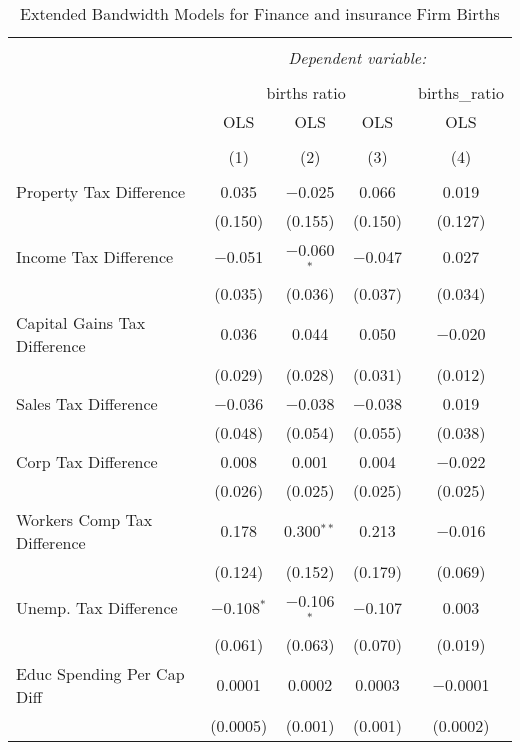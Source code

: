 
\begin{table}[!htbp] \centering 
  \caption{Extended Bandwidth Models for  Finance and insurance Firm Births} 
  \label{52eb} 
\begin{tabular}{@{\extracolsep{5pt}}lcccc} 
\\[-1.8ex]\hline 
\hline \\[-1.8ex] 
 & \multicolumn{4}{c}{\textit{Dependent variable:}} \\ 
\cline{2-5} 
\\[-1.8ex] & \multicolumn{3}{c}{births ratio} & births\_ratio \\ 
 & OLS & OLS & OLS & OLS \\ 
\\[-1.8ex] & (1) & (2) & (3) & (4)\\ 
\hline \\[-1.8ex] 
 Property Tax Difference & 0.035 & $-$0.025 & 0.066 & 0.019 \\ 
  & (0.150) & (0.155) & (0.150) & (0.127) \\ 
  Income Tax Difference & $-$0.051 & $-$0.060$^{*}$ & $-$0.047 & 0.027 \\ 
  & (0.035) & (0.036) & (0.037) & (0.034) \\ 
  Capital Gains Tax Difference & 0.036 & 0.044 & 0.050 & $-$0.020 \\ 
  & (0.029) & (0.028) & (0.031) & (0.012) \\ 
  Sales Tax Difference & $-$0.036 & $-$0.038 & $-$0.038 & 0.019 \\ 
  & (0.048) & (0.054) & (0.055) & (0.038) \\ 
  Corp Tax Difference & 0.008 & 0.001 & 0.004 & $-$0.022 \\ 
  & (0.026) & (0.025) & (0.025) & (0.025) \\ 
  Workers Comp Tax Difference & 0.178 & 0.300$^{**}$ & 0.213 & $-$0.016 \\ 
  & (0.124) & (0.152) & (0.179) & (0.069) \\ 
  Unemp. Tax Difference & $-$0.108$^{*}$ & $-$0.106$^{*}$ & $-$0.107 & 0.003 \\ 
  & (0.061) & (0.063) & (0.070) & (0.019) \\ 
  Educ Spending Per Cap Diff & 0.0001 & 0.0002 & 0.0003 & $-$0.0001 \\ 
  & (0.0005) & (0.001) & (0.001) & (0.0002) \\ 

\end{tabular}
\end{table}
